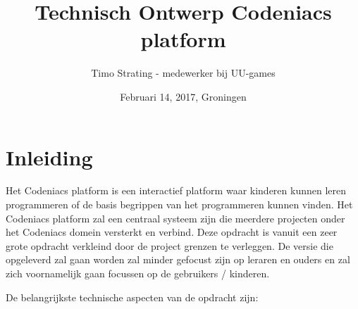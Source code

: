 \documentclass[]{report}
\title{Technisch Ontwerp Codeniacs platform}
\author{Timo Strating - medewerker bij UU-games}
\date{Februari 14, 2017, Groningen}
\begin{document}
\maketitle

\tableofcontents
\newpage






\chapter{Inleiding}

Het Codeniacs platform is een interactief platform waar kinderen kunnen leren programmeren of de basis begrippen van het programmeren kunnen vinden. Het Codeniacs platform zal een centraal systeem zijn die meerdere projecten onder het Codeniacs domein versterkt en verbind. Deze opdracht is vanuit een zeer grote opdracht verkleind door de project grenzen te verleggen. De versie die opgeleverd zal gaan worden zal minder gefocust zijn op leraren en ouders en zal zich voornamelijk gaan focussen op de gebruikers / kinderen. 

\vspace{1 cm}

De belangrijkste technische aspecten van de opdracht zijn:
\end{document}

